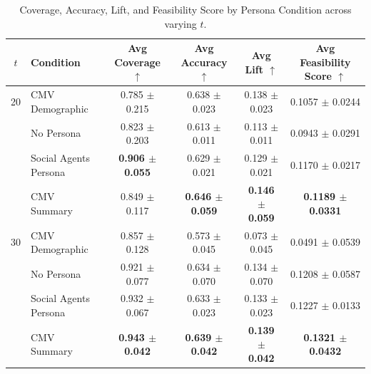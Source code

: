 \begin{table}[H]
\centering
\caption{Coverage, Accuracy, Lift, and Feasibility Score by Persona Condition across varying $t$.}
\label{tab:coverage_accuracy_lift}
\small
\begin{tabular}{clcccc}
\toprule
$t$ & \textbf{Condition} & \textbf{Avg Coverage} $\uparrow$ & \textbf{Avg Accuracy} $\uparrow$ & \textbf{Avg Lift} $\uparrow$ & \textbf{Avg Feasibility Score} $\uparrow$ \\
\midrule
20 & CMV Demographic & 0.785 $\pm$ 0.215 & 0.638 $\pm$ 0.023 & 0.138 $\pm$ 0.023 & 0.1057 $\pm$ 0.0244 \\
& No Persona & 0.823 $\pm$ 0.203 & 0.613 $\pm$ 0.011 & 0.113 $\pm$ 0.011 & 0.0943 $\pm$ 0.0291 \\
& Social Agents Persona & \textbf{0.906 $\pm$ 0.055} & 0.629 $\pm$ 0.021 & 0.129 $\pm$ 0.021 & 0.1170 $\pm$ 0.0217 \\
& CMV Summary & 0.849 $\pm$ 0.117 & \textbf{0.646 $\pm$ 0.059} & \textbf{0.146 $\pm$ 0.059} & \textbf{0.1189 $\pm$ 0.0331} \\
\midrule
30 & CMV Demographic & 0.857 $\pm$ 0.128 & 0.573 $\pm$ 0.045 & 0.073 $\pm$ 0.045 & 0.0491 $\pm$ 0.0539 \\
& No Persona & 0.921 $\pm$ 0.077 & 0.634 $\pm$ 0.070 & 0.134 $\pm$ 0.070 & 0.1208 $\pm$ 0.0587 \\
& Social Agents Persona & 0.932 $\pm$ 0.067 & 0.633 $\pm$ 0.023 & 0.133 $\pm$ 0.023 & 0.1227 $\pm$ 0.0133 \\
& CMV Summary & \textbf{0.943 $\pm$ 0.042} & \textbf{0.639 $\pm$ 0.042} & \textbf{0.139 $\pm$ 0.042} & \textbf{0.1321 $\pm$ 0.0432} \\
\bottomrule
\end{tabular}
\end{table}


